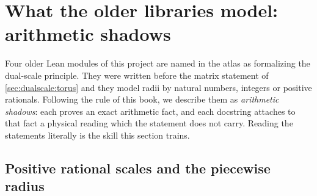 \section{What the older libraries model: arithmetic shadows}\label{sec:dualscale:shadows}

Four older Lean modules of this project are named in the atlas as formalizing the dual-scale
principle. They were written before the matrix statement of \cref{sec:dualscale:torus} and
they model radii by natural numbers, integers or positive rationals. Following the rule of
this book, we describe them as \emph{arithmetic shadows}: each proves
an exact arithmetic fact, and each docstring attaches to that fact a physical reading which the
statement does not carry. Reading the statements literally is the skill this section trains.

\subsection{Positive rational scales and the piecewise radius}

